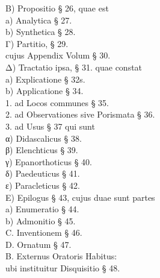 \begin{flushleft}
\hspace*{4.8em}B) Propositio § 26, quae est\\
\hspace*{6em}a) Analytica § 27.\\
\hspace*{6em}b) Synthetica § 28.\\
\hspace*{4.8em}Γ) Partitio, § 29.\\
\hspace*{6em}cujus Appendix Volum § 30.\\
\hspace*{4.8em}Δ) Tractatio ipsa, § 31. quae constat\\
\hspace*{6em}a) Explicatione § 32s.\\
\hspace*{6em}b) Applicatione § 34.\\
\hspace*{7.2em}1. ad Locos communes § 35.\\
\hspace*{7.2em}2. ad Observationes sive Porismata § 36.\\
\hspace*{7.2em}3. ad Usus § 37 qui sunt\\
\hspace*{8.4em}α) Didascalicus § 38.\\
\hspace*{8.4em}β) Elenchticus § 39.\\
\hspace*{8.4em}γ) Epanorthoticus § 40.\\
\hspace*{8.4em}δ) Paedeuticus § 41.\\
\hspace*{8.4em}ε) Paracleticus § 42.\\
\hspace*{4.8em}E) Epilogus § 43, cujus duae sunt partes\\
\hspace*{6em}a) Enumeratio § 44.\\
\hspace*{6em}b) Admonitio § 45.\\
C. Inventionem § 46.\\
D. Ornatum § 47.\\
B. Externus Oratoris Habitus:\\
\hspace*{1.2em}ubi instituitur Disquisitio § 48.\\

\end{flushleft}
